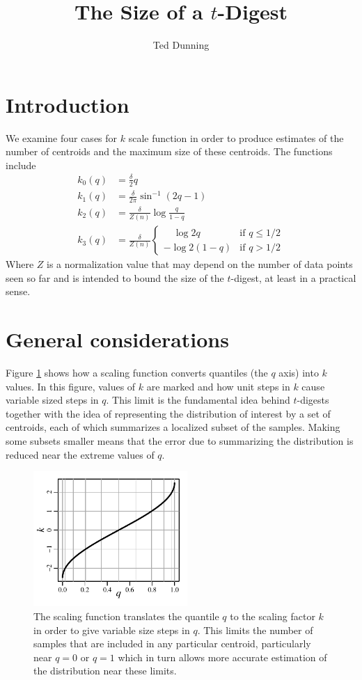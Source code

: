 \documentclass[11pt]{amsart}
\title{The Size of a $t$-Digest}
\author{Ted Dunning}
\date{}                                           %
\begin{document}
\maketitle
\section{Introduction}
We examine four cases for $k$ scale function in order to produce estimates of the number of centroids and the maximum size of these centroids. The functions include
\[
\begin{aligned}
k_0(q) &= \frac \delta 2 q \\
k_1(q) &= \frac \delta {2\pi}  \sin^{-1}(2q-1)   \\
k_2(q) &= \frac \delta {Z(n)} \log {\frac q {1-q}} \\
k_3(q) &= \frac \delta {Z(n)}\begin{cases}
\quad \log 2q & \text{if  } q \le 1/2 \\
- \log 2(1-q) & \text{if  } q > 1/2
\end{cases}
\end{aligned}
\]
Where $Z$ is a normalization value that may depend on the number of data points seen so far and is intended to bound the size of the $t$-digest, at least in a practical sense.
\section{General considerations}
Figure \ref{fig:k-q-plot-full} shows how a scaling function converts quantiles (the $q$ axis) into $k$ values. In this figure, values of $k$ are marked  and how unit steps in $k$ cause variable sized steps in $q$. This limit is the fundamental idea behind $t$-digests together with the idea of representing the distribution of interest by a set of centroids, each of which summarizes a localized subset of the samples. Making some subsets smaller means that the error due to summarizing the distribution is reduced near the extreme values of $q$.
\begin{figure}[htbp] %
   \centering
   \includegraphics[width=2.3in]{../t-digest-paper/figures/k-q-plot.pdf} 
   \caption{The scaling function translates the quantile $q$ to the scaling factor $k$ in order to give variable size steps in $q$. This limits the number of samples that are included in any particular centroid, particularly near $q=0$ or $q=1$ which in turn allows more accurate estimation of the distribution near these limits. }
   \label{fig:k-q-plot-full}
\end{figure}
\end{document}
